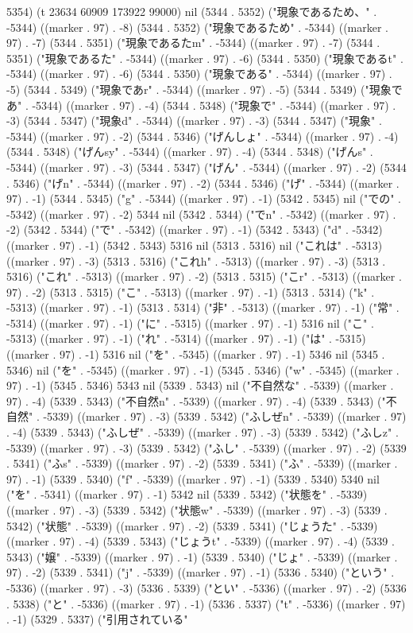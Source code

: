 5354) (t 23634 60909 173922 99000) nil (5344 . 5352) ("現象であるため、" . -5344) ((marker . 97) . -8) (5344 . 5352) ("現象であるため" . -5344) ((marker . 97) . -7) (5344 . 5351) ("現象であるたm" . -5344) ((marker . 97) . -7) (5344 . 5351) ("現象であるた" . -5344) ((marker . 97) . -6) (5344 . 5350) ("現象であるt" . -5344) ((marker . 97) . -6) (5344 . 5350) ("現象である" . -5344) ((marker . 97) . -5) (5344 . 5349) ("現象であr" . -5344) ((marker . 97) . -5) (5344 . 5349) ("現象であ" . -5344) ((marker . 97) . -4) (5344 . 5348) ("現象で" . -5344) ((marker . 97) . -3) (5344 . 5347) ("現象d" . -5344) ((marker . 97) . -3) (5344 . 5347) ("現象" . -5344) ((marker . 97) . -2) (5344 . 5346) ("げんしょ" . -5344) ((marker . 97) . -4) (5344 . 5348) ("げんsy" . -5344) ((marker . 97) . -4) (5344 . 5348) ("げんs" . -5344) ((marker . 97) . -3) (5344 . 5347) ("げん" . -5344) ((marker . 97) . -2) (5344 . 5346) ("げn" . -5344) ((marker . 97) . -2) (5344 . 5346) ("げ" . -5344) ((marker . 97) . -1) (5344 . 5345) ("g" . -5344) ((marker . 97) . -1) (5342 . 5345) nil ("での" . -5342) ((marker . 97) . -2) 5344 nil (5342 . 5344) ("でn" . -5342) ((marker . 97) . -2) (5342 . 5344) ("で" . -5342) ((marker . 97) . -1) (5342 . 5343) ("d" . -5342) ((marker . 97) . -1) (5342 . 5343) 5316 nil (5313 . 5316) nil ("これは" . -5313) ((marker . 97) . -3) (5313 . 5316) ("これh" . -5313) ((marker . 97) . -3) (5313 . 5316) ("これ" . -5313) ((marker . 97) . -2) (5313 . 5315) ("こr" . -5313) ((marker . 97) . -2) (5313 . 5315) ("こ" . -5313) ((marker . 97) . -1) (5313 . 5314) ("k" . -5313) ((marker . 97) . -1) (5313 . 5314) ("非" . -5313) ((marker . 97) . -1) ("常" . -5314) ((marker . 97) . -1) ("に" . -5315) ((marker . 97) . -1) 5316 nil ("こ" . -5313) ((marker . 97) . -1) ("れ" . -5314) ((marker . 97) . -1) ("は" . -5315) ((marker . 97) . -1) 5316 nil ("を" . -5345) ((marker . 97) . -1) 5346 nil (5345 . 5346) nil ("を" . -5345) ((marker . 97) . -1) (5345 . 5346) ("w" . -5345) ((marker . 97) . -1) (5345 . 5346) 5343 nil (5339 . 5343) nil ("不自然な" . -5339) ((marker . 97) . -4) (5339 . 5343) ("不自然n" . -5339) ((marker . 97) . -4) (5339 . 5343) ("不自然" . -5339) ((marker . 97) . -3) (5339 . 5342) ("ふしぜn" . -5339) ((marker . 97) . -4) (5339 . 5343) ("ふしぜ" . -5339) ((marker . 97) . -3) (5339 . 5342) ("ふしz" . -5339) ((marker . 97) . -3) (5339 . 5342) ("ふし" . -5339) ((marker . 97) . -2) (5339 . 5341) ("ふs" . -5339) ((marker . 97) . -2) (5339 . 5341) ("ふ" . -5339) ((marker . 97) . -1) (5339 . 5340) ("f" . -5339) ((marker . 97) . -1) (5339 . 5340) 5340 nil ("を" . -5341) ((marker . 97) . -1) 5342 nil (5339 . 5342) ("状態を" . -5339) ((marker . 97) . -3) (5339 . 5342) ("状態w" . -5339) ((marker . 97) . -3) (5339 . 5342) ("状態" . -5339) ((marker . 97) . -2) (5339 . 5341) ("じょうた" . -5339) ((marker . 97) . -4) (5339 . 5343) ("じょうt" . -5339) ((marker . 97) . -4) (5339 . 5343) ("嬢" . -5339) ((marker . 97) . -1) (5339 . 5340) ("じょ" . -5339) ((marker . 97) . -2) (5339 . 5341) ("j" . -5339) ((marker . 97) . -1) (5336 . 5340) ("という" . -5336) ((marker . 97) . -3) (5336 . 5339) ("とい" . -5336) ((marker . 97) . -2) (5336 . 5338) ("と" . -5336) ((marker . 97) . -1) (5336 . 5337) ("t" . -5336) ((marker . 97) . -1) (5329 . 5337) ("引用されている" 